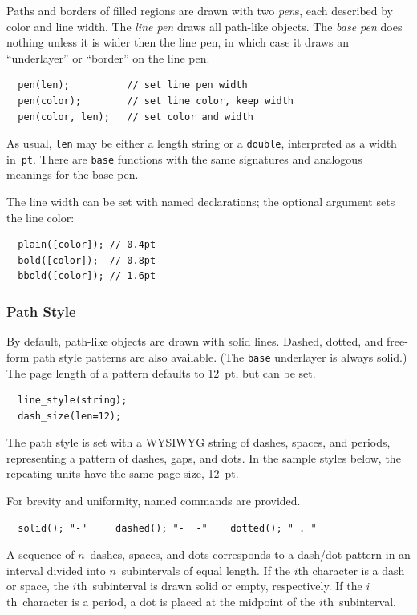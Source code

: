 \documentclass[12pt,letterpaper]{book}
\newcommand{\code}[1]{\texttt{#1}}
\newcommand{\teximath}[1]{$#1$}
\newcommand{\findex}[1]{\ignorespaces}
\begin{document}
Paths and borders of filled regions are drawn with two \emph{pen}s,
each described by color and line width. The \emph{line pen} draws
all path-like objects. The \emph{base pen} does nothing unless it is
wider then the line pen, in which case it draws an ``underlayer'' or
``border'' on the line pen.
\findex{pen}
\begin{verbatim}
  pen(len);          // set line pen width
  pen(color);        // set line color, keep width
  pen(color, len);   // set color and width
\end{verbatim}
As usual, \code{len} may be either a length string or a \code{double},
interpreted as a width in~\code{pt}.  There are \code{base} functions
with the same signatures and analogous meanings for the base pen.

The line width can be set with named declarations; the optional
argument sets the line color:
\findex{plain}
\findex{bold}
\findex{bbold}
\begin{verbatim}
  plain([color]); // 0.4pt
  bold([color]);  // 0.8pt
  bbold([color]); // 1.6pt
\end{verbatim}


\subsubsection*{Path Style}

By default, path-like objects are drawn with solid lines. Dashed,
dotted, and free-form path style patterns are also available. (The
\code{base} underlayer is always solid.) The page length of a pattern
defaults to 12~pt, but can be set.
\findex{line\_style}
\findex{dash\_size}
\begin{verbatim}
  line_style(string);
  dash_size(len=12); 
\end{verbatim}
The path style is set with a WYSIWYG string of dashes, spaces, and
periods, representing a pattern of dashes, gaps, and dots. In the
sample styles below, the repeating units have the same page size,
12~pt. 
\begin{center}
  
\end{center}
For brevity and uniformity, named commands are provided.
\findex{solid}
\findex{dashed}
\findex{dotted}
\begin{verbatim}
  solid(); "-"     dashed(); "-  -"    dotted(); " . "
\end{verbatim}
A sequence of \teximath{n}~dashes, spaces, and dots corresponds to a
dash/dot pattern in an interval divided into \teximath{n}~subintervals
of equal length. If the \teximath{i}th character is a dash or space,
the \teximath{i}th~subinterval is drawn solid or empty,
respectively. If the \teximath{i}th~character is a period, a dot is
placed at the midpoint of the \teximath{i}th~subinterval.
\end{document}
